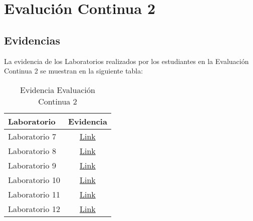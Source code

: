 \chapter{Evalución Continua 2}
\newpage


\pagestyle{empty} %

\section{Evidencias}
La evidencia de los Laboratorios realizados por los estudiantes en la Evaluación Continua 2 se muestran en la siguiente tabla:

\begin{table}[h]
\centering
\begin{tabular}{l|c}
\hline
\textbf{Laboratorio} & 
\textbf{Evidencia} 
\\ \hline
Laboratorio 7 &
\href{https://drive.google.com/open?id=14bUBsi5mWcXdS7T6exKaAuNErO6ghBht}{Link}
\\ \hline
Laboratorio 8 &
\href{https://drive.google.com/open?id=18ME0C-p_CZaEEWIDGRZS0E8kqWfivRzz}{Link}
\\ \hline
Laboratorio 9 &
\href{https://drive.google.com/open?id=1EaewLSz7uR3Yes-7xTqEYHubzUO-OvRo}{Link}
\\ \hline
Laboratorio 10 &
\href{https://drive.google.com/open?id=1AyoTRNG5cdVN_4KT6GYTrjZeZNXVxDkp}{Link}
\\ \hline
Laboratorio 11 &
\href{https://drive.google.com/open?id=1m_iLv_y333cEQlWQcaO8i-b-9oErs1Pk}{Link}
\\ \hline
Laboratorio 12 &
\href{https://drive.google.com/open?id=133KLivggAiWVx9Thj8FWoMFue7hb6pXo}{Link}
\\ \hline
\end{tabular}
\caption{Evidencia Evaluación Continua 2}
\label{tab:evidencia_evaluacion_continua_2} %
\end{table}

